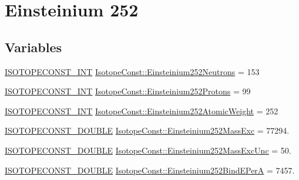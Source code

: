 \hypertarget{group___isotope_const-_einsteinium-_es252}{}\section{Einsteinium 252}
\label{group___isotope_const-_einsteinium-_es252}
\subsection*{Variables}
\begin{DoxyCompactItemize}
\item 
\mbox{\hyperlink{group___isotope_const-_macros_ga5f18360b3e99483a35c32d789e62621c}{I\+S\+O\+T\+O\+P\+E\+C\+O\+N\+S\+T\+\_\+\+I\+NT}} \mbox{\hyperlink{group___isotope_const-_einsteinium-_es252_ga1248a33fdf99615c4a743599a06a61d3}{Isotope\+Const\+::\+Einsteinium252\+Neutrons}} = 153
\item 
\mbox{\hyperlink{group___isotope_const-_macros_ga5f18360b3e99483a35c32d789e62621c}{I\+S\+O\+T\+O\+P\+E\+C\+O\+N\+S\+T\+\_\+\+I\+NT}} \mbox{\hyperlink{group___isotope_const-_einsteinium-_es252_gaf0f8081c7976f74aef4d86cfe8b99d24}{Isotope\+Const\+::\+Einsteinium252\+Protons}} = 99
\item 
\mbox{\hyperlink{group___isotope_const-_macros_ga5f18360b3e99483a35c32d789e62621c}{I\+S\+O\+T\+O\+P\+E\+C\+O\+N\+S\+T\+\_\+\+I\+NT}} \mbox{\hyperlink{group___isotope_const-_einsteinium-_es252_ga59712cbe054685f3d55d8ef456687d2c}{Isotope\+Const\+::\+Einsteinium252\+Atomic\+Weight}} = 252
\item 
\mbox{\hyperlink{group___isotope_const-_macros_ga8f45a7272ce02c0b4c65c44636ed719a}{I\+S\+O\+T\+O\+P\+E\+C\+O\+N\+S\+T\+\_\+\+D\+O\+U\+B\+LE}} \mbox{\hyperlink{group___isotope_const-_einsteinium-_es252_ga0657b78cc66d5c60add731eb8c3cd8ad}{Isotope\+Const\+::\+Einsteinium252\+Mass\+Exc}} = 77294.
\item 
\mbox{\hyperlink{group___isotope_const-_macros_ga8f45a7272ce02c0b4c65c44636ed719a}{I\+S\+O\+T\+O\+P\+E\+C\+O\+N\+S\+T\+\_\+\+D\+O\+U\+B\+LE}} \mbox{\hyperlink{group___isotope_const-_einsteinium-_es252_ga655c671c92965cf8a185d2b0ef9afa28}{Isotope\+Const\+::\+Einsteinium252\+Mass\+Exc\+Unc}} = 50.
\item 
\mbox{\hyperlink{group___isotope_const-_macros_ga8f45a7272ce02c0b4c65c44636ed719a}{I\+S\+O\+T\+O\+P\+E\+C\+O\+N\+S\+T\+\_\+\+D\+O\+U\+B\+LE}} \mbox{\hyperlink{group___isotope_const-_einsteinium-_es252_gab3851da0ede604449129566154bcc5d9}{Isotope\+Const\+::\+Einsteinium252\+Bind\+E\+PerA}} = 7457.

\end{DoxyCompactItemize}
